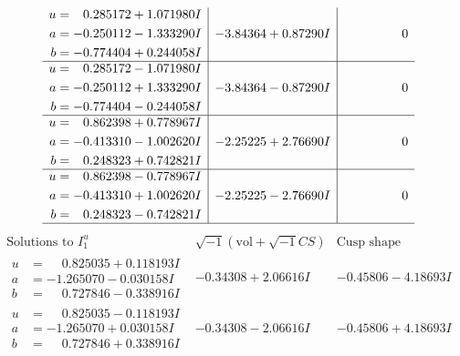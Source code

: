 \documentclass[1p]{elsarticle_modified}
\theoremstyle{definition}
\newcommand{\I}{\sqrt{-1}}
\begin{document}
$$\begin{array}{c|c|c}
\begin{aligned}
u &= \phantom{-}0.285172 + 1.071980 I \\
a &= -0.250112 - 1.333290 I \\
b &= -0.774404 + 0.244058 I\end{aligned}
 & -3.84364 + 0.87290 I & \phantom{-0.000000 } 0 \\ \hline\begin{aligned}
u &= \phantom{-}0.285172 - 1.071980 I \\
a &= -0.250112 + 1.333290 I \\
b &= -0.774404 - 0.244058 I\end{aligned}
 & -3.84364 - 0.87290 I & \phantom{-0.000000 } 0 \\ \hline\begin{aligned}
u &= \phantom{-}0.862398 + 0.778967 I \\
a &= -0.413310 - 1.002620 I \\
b &= \phantom{-}0.248323 + 0.742821 I\end{aligned}
 & -2.25225 + 2.76690 I & \phantom{-0.000000 } 0 \\ \hline\begin{aligned}
u &= \phantom{-}0.862398 - 0.778967 I \\
a &= -0.413310 + 1.002620 I \\
b &= \phantom{-}0.248323 - 0.742821 I\end{aligned}
 & -2.25225 - 2.76690 I & \phantom{-0.000000 } 0\\
 \hline 
 \end{array}$$\newpage$$\begin{array}{c|c|c}  
\text{Solutions to }I^u_{1}& \I (\text{vol} + \sqrt{-1}CS) & \text{Cusp shape}\\
 \hline 
\begin{aligned}
u &= \phantom{-}0.825035 + 0.118193 I \\
a &= -1.265070 - 0.030158 I \\
b &= \phantom{-}0.727846 - 0.338916 I\end{aligned}
 & -0.34308 + 2.06616 I & -0.45806 - 4.18693 I \\ \hline\begin{aligned}
u &= \phantom{-}0.825035 - 0.118193 I \\
a &= -1.265070 + 0.030158 I \\
b &= \phantom{-}0.727846 + 0.338916 I\end{aligned}
 & -0.34308 - 2.06616 I & -0.45806 + 4.18693 I \\ \hline\begin{aligned}

\end{aligned}
\end{array}$$
\end{document}
